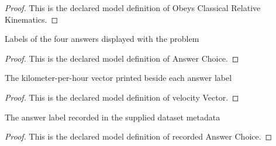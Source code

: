 \begin{proof}
  This is the declared model definition of Obeys Classical Relative Kinematics.
\end{proof}
\begin{definition}
  \label{def:physics:phyx-mini-0748:phyxminiproblems-problemphyxmini0748-answerchoice}
  Labels of the four answers displayed with the problem
\end{definition}
\begin{proof}
  This is the declared model definition of Answer Choice.
\end{proof}
\begin{definition}
  \label{def:physics:phyx-mini-0748:phyxminiproblems-problemphyxmini0748-answerchoice-velocityvector}
  The kilometer-per-hour vector printed beside each answer label
\end{definition}
\begin{proof}
  This is the declared model definition of velocity Vector.
\end{proof}
\begin{definition}
  \label{def:physics:phyx-mini-0748:phyxminiproblems-problemphyxmini0748-recordedanswerchoice}
  The answer label recorded in the supplied dataset metadata
\end{definition}
\begin{proof}
  This is the declared model definition of recorded Answer Choice.
\end{proof}
